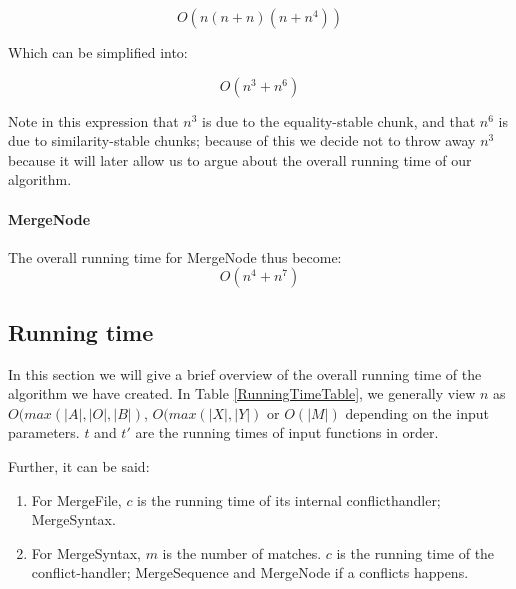 \documentclass[11pt]{article}
\begin{document}
\begin{equation}
O(n (n + n)(n + n^4)) \nonumber
\end{equation}

Which can be simplified into:

\begin{equation}
O(n^3 + n^6) \nonumber
\end{equation}

Note in this expression that $n^3$ is due to the equality-stable chunk, and that $n^6$ is due to similarity-stable chunks; because of this we decide not to throw away $n^3$ because it will later allow us to argue about the overall running time of our algorithm.

\paragraph{MergeNode} The overall running time for MergeNode thus become:
\begin{equation}
O(n^4 + n^7) \nonumber
\end{equation}


\subsection{Running time}
In this section we will give a brief overview of the overall running time of the algorithm we have created. In Table \ref{RunningTimeTable}, we generally view $n$ as $O(max(|A|, |O|, |B|)$, $O(max(|X|, |Y|)$  or $O(|M|)$ depending on the input parameters. $t$ and $t'$ are the running times of input functions in order.

Further, it can be said:

\begin{enumerate}
\item For MergeFile, $c$ is the running time of its internal conflicthandler; MergeSyntax.
\item For MergeSyntax, $m$ is the number of matches. $c$ is the running time of the conflict-handler; MergeSequence and MergeNode if a conflicts happens.
\end{enumerate}
\end{document}
